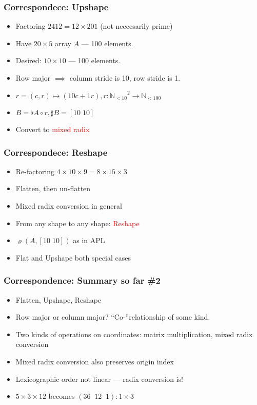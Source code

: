\documentclass[xetex,mathserif,serif]{beamer}
\newcommand\Nat{\mathbb{N}}
\newcommand\NB[1]{\textcolor{red}{#1}}
\begin{document}
\begin{frame}
  \frametitle{Correspondece: Upshape} 
  \begin{itemize}%
    \item Factoring \(2412 = 12 \times 201\) (not neccesarily prime)
    \item Have \(20\times 5\) array \(A\) --- 100 elements.
    \item Desired: \(10 \times 10\) --- 100 elements.
    \item Row major \(\implies\) column stride is 10, row stride is 1.
    \item \(r = (c, r)\mapsto (10c + 1r), r : {\Nat_{<10}}^2 \to \Nat_{<100}\)
    \item \(B = \flat A \circ r, \sharp B = [10\;10]\)
    \item Convert to \NB{mixed radix}
  \end{itemize}
\end{frame}


\begin{frame}
  \frametitle{Correspondece: Reshape}
  \begin{itemize}%
    \item Re-factoring \(4\times 10 \times 9 = 8 \times 15 \times 3\)
    \item Flatten, then un-flatten
    \item Mixed radix conversion in general
    \item From any shape to any shape: \NB{Reshape}
    \item \(\varrho(A, [10\;10])\) as in APL
    \item Flat and Upshape both special cases
  \end{itemize}
\end{frame}

\begin{frame}
  \frametitle{Correspondence: Summary so far \#2}
  \begin{itemize}%
    \item Flatten, Upshape, Reshape
    \item Row major or column major? ``Co-''relationship of some kind.
    \item Two kinds of operations on coordinates: matrix multiplication, mixed radix conversion
    \item Mixed radix conversion also preserves origin index
    \item Lexicographic order not linear --- radix conversion is!
    \item \(5\times3\times12\) becomes \((36\;\;12\;\;1) : 1 \times 3\)
  \end{itemize}
\end{frame}
\end{document}
